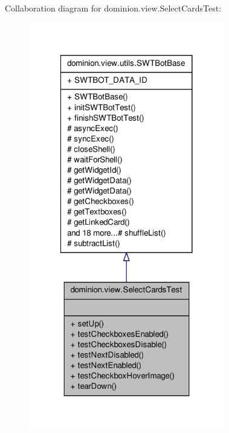 \-Collaboration diagram for dominion.\-view.\-Select\-Cards\-Test\-:
\nopagebreak
\begin{figure}[H]
\begin{center}
\leavevmode
\includegraphics[width=242pt]{classdominion_1_1view_1_1SelectCardsTest__coll__graph}
\end{center}
\end{figure}
